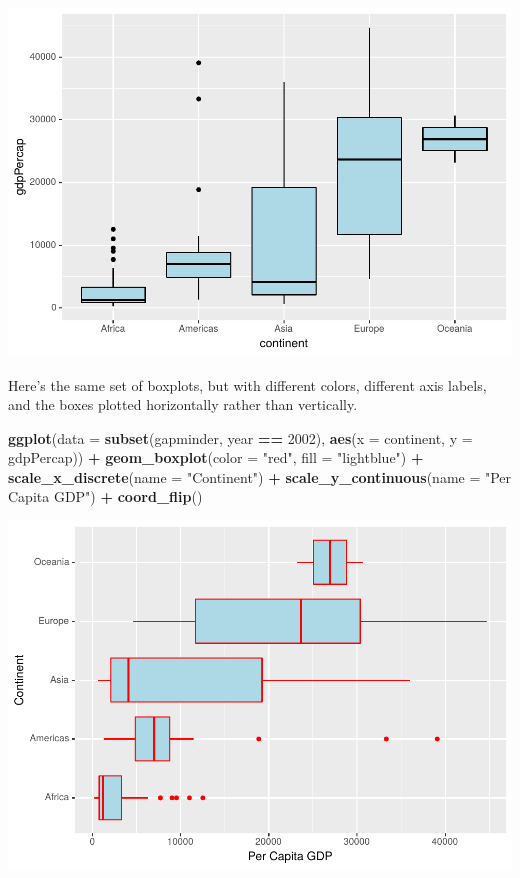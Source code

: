 \documentclass[
]{krantz}
\makeatletter
\newenvironment{Shaded}{\begin{snugshade}}{\end{snugshade}}
\newcommand{\DataTypeTok}[1]{\textcolor[rgb]{0.27,0.27,0.27}{#1}}
\newcommand{\DecValTok}[1]{\textcolor[rgb]{0.06,0.06,0.06}{#1}}
\newcommand{\KeywordTok}[1]{\textcolor[rgb]{0.27,0.27,0.27}{\textbf{#1}}}
\newcommand{\NormalTok}[1]{#1}
\newcommand{\OperatorTok}[1]{\textcolor[rgb]{0.43,0.43,0.43}{\textbf{#1}}}
\newcommand{\StringTok}[1]{\textcolor[rgb]{0.5,0.5,0.5}{#1}}
\newenvironment{kframe}{%
\medskip{}
\setlength{\fboxsep}{.8em}
 \def\at@end@of@kframe{}%
 \ifinner\ifhmode%
  \def\at@end@of@kframe{\end{minipage}}%
  \begin{minipage}{\columnwidth}%
 \fi\fi%
 \def\FrameCommand##1{\hskip\@totalleftmargin \hskip-\fboxsep
 \colorbox{shadecolor}{##1}\hskip-\fboxsep
     \hskip-\linewidth \hskip-\@totalleftmargin \hskip\columnwidth}%
 \MakeFramed {\advance\hsize-\width
   \@totalleftmargin\z@ \linewidth\hsize
   \@setminipage}}%
 {\par\unskip\endMakeFramed%
 \at@end@of@kframe}
\renewenvironment{Shaded}{\begin{kframe}}{\end{kframe}}
\makeatother
\begin{document}
\includegraphics{bookdown_files/figure-latex/unnamed-chunk-77-1.pdf}

Here's the same set of boxplots, but with different colors, different axis labels, and the boxes plotted horizontally rather than vertically.

\begin{Shaded}
\begin{Highlighting}[]
\KeywordTok{ggplot}\NormalTok{(}\DataTypeTok{data =} \KeywordTok{subset}\NormalTok{(gapminder,  year }\OperatorTok{==}\StringTok{ }\DecValTok{2002}\NormalTok{), }
       \KeywordTok{aes}\NormalTok{(}\DataTypeTok{x =}\NormalTok{ continent, }\DataTypeTok{y =}\NormalTok{ gdpPercap)) }\OperatorTok{+}\StringTok{ }
\StringTok{    }\KeywordTok{geom\_boxplot}\NormalTok{(}\DataTypeTok{color =} \StringTok{"red"}\NormalTok{, }\DataTypeTok{fill =} \StringTok{"lightblue"}\NormalTok{) }\OperatorTok{+}\StringTok{ }
\StringTok{    }\KeywordTok{scale\_x\_discrete}\NormalTok{(}\DataTypeTok{name =} \StringTok{"Continent"}\NormalTok{) }\OperatorTok{+}\StringTok{ }
\StringTok{    }\KeywordTok{scale\_y\_continuous}\NormalTok{(}\DataTypeTok{name =} \StringTok{"Per Capita GDP"}\NormalTok{) }\OperatorTok{+}\StringTok{ }\KeywordTok{coord\_flip}\NormalTok{()}
\end{Highlighting}
\end{Shaded}

\includegraphics{bookdown_files/figure-latex/unnamed-chunk-78-1.pdf}
\end{document}
